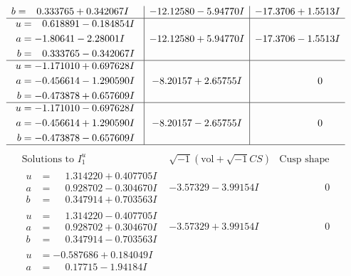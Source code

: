 \documentclass[1p]{elsarticle_modified}
\theoremstyle{definition}
\newcommand{\I}{\sqrt{-1}}
\begin{document}
$$\begin{array}{c|c|c}
\begin{aligned}
b &= \phantom{-}0.333765 + 0.342067 I\end{aligned}
 & -12.12580 - 5.94770 I & -17.3706 + 1.5513 I \\ \hline\begin{aligned}
u &= \phantom{-}0.618891 - 0.184854 I \\
a &= -1.80641 - 2.28001 I \\
b &= \phantom{-}0.333765 - 0.342067 I\end{aligned}
 & -12.12580 + 5.94770 I & -17.3706 - 1.5513 I \\ \hline\begin{aligned}
u &= -1.171010 + 0.697628 I \\
a &= -0.456614 - 1.290590 I \\
b &= -0.473878 + 0.657609 I\end{aligned}
 & -8.20157 + 2.65755 I & \phantom{-0.000000 } 0 \\ \hline\begin{aligned}
u &= -1.171010 - 0.697628 I \\
a &= -0.456614 + 1.290590 I \\
b &= -0.473878 - 0.657609 I\end{aligned}
 & -8.20157 - 2.65755 I & \phantom{-0.000000 } 0\\
 \hline 
 \end{array}$$\newpage$$\begin{array}{c|c|c}  
\text{Solutions to }I^u_{1}& \I (\text{vol} + \sqrt{-1}CS) & \text{Cusp shape}\\
 \hline 
\begin{aligned}
u &= \phantom{-}1.314220 + 0.407705 I \\
a &= \phantom{-}0.928702 - 0.304670 I \\
b &= \phantom{-}0.347914 + 0.703563 I\end{aligned}
 & -3.57329 - 3.99154 I & \phantom{-0.000000 } 0 \\ \hline\begin{aligned}
u &= \phantom{-}1.314220 - 0.407705 I \\
a &= \phantom{-}0.928702 + 0.304670 I \\
b &= \phantom{-}0.347914 - 0.703563 I\end{aligned}
 & -3.57329 + 3.99154 I & \phantom{-0.000000 } 0 \\ \hline\begin{aligned}
u &= -0.587686 + 0.184049 I \\
a &= \phantom{-}0.17715 - 1.94184 I \\

\end{aligned}
\end{array}$$
\end{document}
